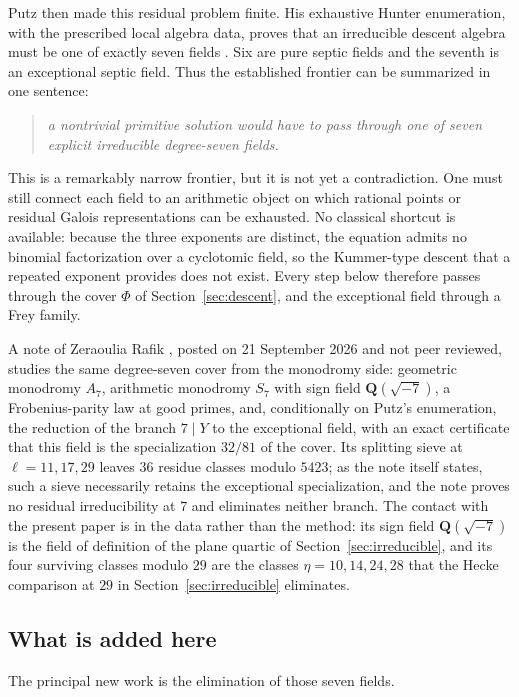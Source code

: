 \documentclass[11pt]{article}
\newcommand{\Q}{\mathbf Q}
\theoremstyle{definition}
\theoremstyle{remark}
\begin{document}
Putz then made this residual problem finite.  His exhaustive Hunter
enumeration, with the prescribed local algebra data, proves that an
irreducible descent algebra must be one of exactly seven fields
\cite[Theorem~3.50]{Putz}.  Six are pure septic fields and the seventh is an
exceptional septic field.  Thus the established frontier can be summarized in
one sentence:
\begin{quote}
\emph{a nontrivial primitive solution would have to pass through one of seven
explicit irreducible degree-seven fields.}
\end{quote}
This is a remarkably narrow frontier, but it is not yet a contradiction.
One must still connect each field to an arithmetic object on which rational
points or residual Galois representations can be exhausted.  No classical
shortcut is available: because the three exponents are distinct, the
equation admits no binomial factorization over a cyclotomic field, so the
Kummer-type descent that a repeated exponent provides does not exist.
Every step below therefore passes through the cover $\Phi$ of
Section~\ref{sec:descent}, and the exceptional field through a Frey family.

A note of Zeraoulia Rafik \cite{ZeraouliaRafik}, posted on 21 September
2026 and not peer reviewed, studies the same degree-seven cover from the
monodromy side: geometric monodromy $A_7$, arithmetic monodromy $S_7$
with sign field $\Q(\sqrt{-7})$, a Frobenius-parity law at good primes,
and, conditionally on Putz's enumeration, the reduction of the branch
$7\mid Y$ to the exceptional field, with an exact certificate that this
field is the specialization $32/81$ of the cover.  Its splitting sieve at
$\ell=11,17,29$ leaves $36$ residue classes modulo $5423$; as the note
itself states, such a sieve necessarily retains the exceptional
specialization, and the note proves no residual irreducibility at $7$
and eliminates neither branch.  The contact with the present paper is in
the data rather than the method: its sign field $\Q(\sqrt{-7})$ is the
field of definition of the plane quartic of Section~\ref{sec:irreducible},
and its four surviving classes modulo $29$ are the classes
$\eta=10,14,24,28$ that the Hecke comparison at $29$ in
Section~\ref{sec:irreducible} eliminates.

\subsection{What is added here}

The principal new work is the elimination of those seven fields.
\end{document}

